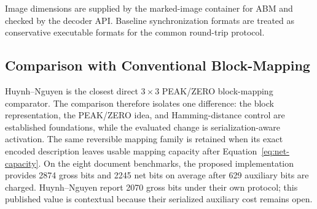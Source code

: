 \documentclass[a4paper,fleqn]{cas-dc}
\newcommand{\RevisionAddBegin}{\begingroup\color{revisionblue}}
\newcommand{\RevisionAddEnd}{\endgroup}
\begin{document}
\begin{table}[t]
\centering
\caption{Executable auxiliary-information model used for exact extraction and
restoration.}
\label{tab:wire-model}
\vspace{2pt}
{\footnotesize\RaggedRight Image dimensions are supplied by the marked-image container for ABM
and checked by the decoder API. Baseline synchronization formats are treated
as conservative executable formats for the common round-trip protocol.\par}
\end{table}

\subsection{Comparison with Conventional Block-Mapping}

\RevisionAddBegin
Huynh--Nguyen \cite{Huynh2025BlockMapping} is the closest direct
$3\times3$ PEAK/ZERO block-mapping comparator. The comparison therefore
isolates one difference: the block representation, the PEAK/ZERO idea, and
Hamming-distance control are established foundations, while the evaluated
change is serialization-aware activation. The same reversible mapping family is
retained when its exact encoded description leaves usable mapping capacity after
Equation~\ref{eq:net-capacity}. On the eight document benchmarks, the proposed
implementation provides 2874 gross bits and 2245 net bits on average after 629
auxiliary bits are charged. Huynh--Nguyen report 2070 gross bits under their
own protocol; this published value is contextual because
their serialized auxiliary cost remains open.
\RevisionAddEnd
\end{document}
